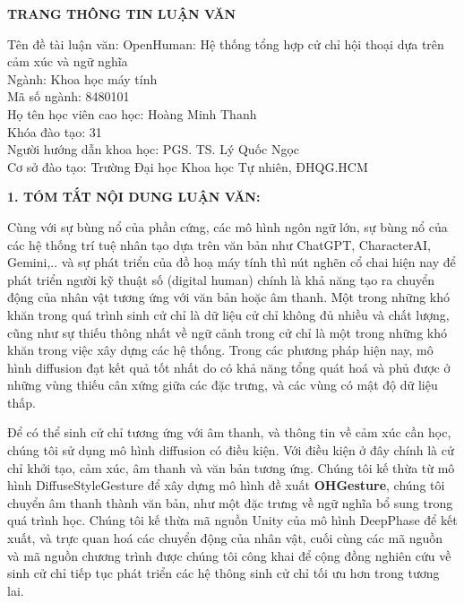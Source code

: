 {}
\begin{center}
{\centering \MakeUppercase \LARGE \fontsize{16.16}{19.26}\selectfont \bfseries TRANG THÔNG TIN LUẬN VĂN}
\end{center}
{
\setlength{\parindent}{0pt}
Tên đề tài luận văn: OpenHuman: Hệ thống tổng hợp cử chỉ hội thoại dựa trên cảm xúc và ngữ nghĩa \\
Ngành: Khoa học máy tính \\
Mã số ngành:  8480101 \\
Họ tên học viên cao học: Hoàng Minh Thanh \\
Khóa đào tạo: 31 \\
Người hướng dẫn khoa học: PGS. TS. Lý Quốc Ngọc \\
Cơ sở đào tạo: Trường Đại học Khoa học Tự nhiên, ĐHQG.HCM}

\vspace{10pt}
{\MakeUppercase \Large \bfseries 1. TÓM TẮT NỘI DUNG LUẬN VĂN:}

Cùng với sự bùng nổ của phần cứng, các mô hình ngôn ngữ lớn, sự bùng nổ của các hệ thống trí tuệ nhân tạo dựa trên văn bản như ChatGPT, CharacterAI, Gemini,..  và sự phát triển của đồ hoạ máy tính thì nút nghẽn cổ chai hiện nay để phát triển người kỹ thuật số (digital human) chính là khả năng tạo ra chuyển động của nhân vật tương ứng với văn bản hoặc âm thanh.
Một trong những khó khăn trong quá trình sinh cử chỉ là dữ liệu cử chỉ không đủ nhiều và chất lượng, cũng như sự thiếu thông nhất về ngữ cảnh trong cử chỉ là một trong những khó khăn trong việc xây dựng các hệ thống. Trong các phương pháp hiện nay,  mô hình diffusion đạt kết quả tốt nhất do có khả năng tổng quát hoá và phủ được ở những vùng thiếu cân xứng giữa các đặc trưng, và các vùng có mật độ dữ liệu thấp.

 Để có thể sinh cử chỉ tương ứng với âm thanh, và thông tin về cảm xúc cần học, chúng tôi sử dụng mô hình diffusion có điều kiện. Với điều kiện ở đây chính là cử chỉ khởi tạo, cảm xúc, âm thanh và văn bản tương ứng.
Chúng tôi kế thừa từ mô hình DiffuseStyleGesture để xây dựng mô hình đề xuất \textbf{OHGesture}, chúng tôi chuyển âm thanh thành văn bản, như một đặc trưng về ngữ nghĩa bổ sung trong quá trình học. Chúng tôi kế thừa mã nguồn Unity của mô hình DeepPhase để kết xuất, và trực quan hoá các chuyển động của nhân vật, cuối cùng các mã nguồn và mã nguồn chương trình được chúng tôi công khai để cộng đồng nghiên cứu về sinh cử chỉ tiếp tục phát triển các hệ thông sinh cử chỉ tối ưu hơn trong tương lai. 

